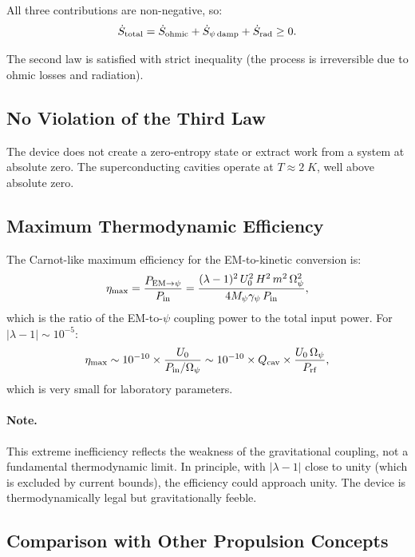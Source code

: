 \documentclass[aps,prd,twocolumn,superscriptaddress,floatfix,nofootinbib]{revtex4-2}
\newcommand{\Opsi}{\Omega_\psi}
\newcommand{\gpsi}{\gamma_\psi}
\newcommand{\Mpsi}{M_\psi}
\newcommand{\lam}{\lambda}
\begin{document}
All three contributions are non-negative, so:
\begin{equation}
\dot{S}_{\rm total} = \dot{S}_{\rm ohmic} + \dot{S}_{\psi\,{\rm damp}}
+ \dot{S}_{\rm rad} \geq 0.
\label{eq:entropy-production}
\end{equation}

The second law is satisfied with strict inequality (the process is
irreversible due to ohmic losses and radiation).

\subsection{No Violation of the Third Law}

The device does not create a zero-entropy state or extract work from
a system at absolute zero. The superconducting cavities operate at
$T \approx 2\;\si{K}$, well above absolute zero.

\subsection{Maximum Thermodynamic Efficiency}

The Carnot-like maximum efficiency for the EM-to-kinetic conversion is:
\begin{equation}
\eta_{\rm max} = \frac{P_{\rm EM\to\psi}}{P_{\rm in}}
= \frac{(\lam-1)^2\,U_0^2\,H^2\,m^2\,\Opsi^2}
{4\Mpsi\gpsi\,P_{\rm in}},
\label{eq:eta-max}
\end{equation}
which is the ratio of the EM-to-$\psi$ coupling power to the total
input power. For $|\lam-1| \sim 10^{-5}$:
\begin{equation}
\eta_{\rm max} \sim 10^{-10} \times \frac{U_0}{P_{\rm in}/\Opsi}
\sim 10^{-10} \times Q_{\rm cav} \times \frac{U_0\,\Opsi}{P_{\rm rf}},
\end{equation}
which is very small for laboratory parameters.

\paragraph{Note.} This extreme inefficiency reflects the weakness of
the gravitational coupling, not a fundamental thermodynamic limit. In
principle, with $|\lam-1|$ close to unity (which is excluded by current
bounds), the efficiency could approach unity. The device is
thermodynamically legal but gravitationally feeble.

\subsection{Comparison with Other Propulsion Concepts}
\end{document}
